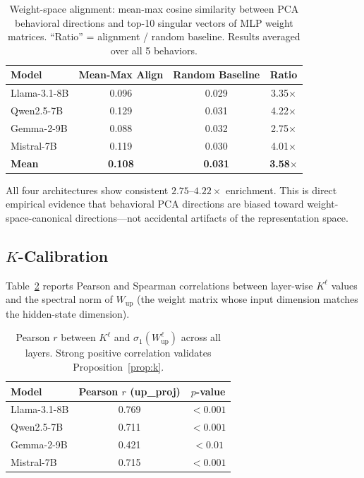 \documentclass{article}
\begin{document}
\begin{table}[t]
\centering
\caption{Weight-space alignment: mean-max cosine similarity between PCA behavioral
  directions and top-10 singular vectors of MLP weight matrices.
  ``Ratio'' = alignment / random baseline.
  Results averaged over all 5 behaviors.}
\label{tab:alignment}
\begin{tabular}{lccc}
\toprule
Model & Mean-Max Align & Random Baseline & Ratio \\
\midrule
Llama-3.1-8B   & 0.096 & 0.029 & 3.35$\times$ \\
Qwen2.5-7B     & 0.129 & 0.031 & 4.22$\times$ \\
Gemma-2-9B     & 0.088 & 0.032 & 2.75$\times$ \\
Mistral-7B     & 0.119 & 0.030 & 4.01$\times$ \\
\midrule
\textbf{Mean}  & \textbf{0.108} & \textbf{0.031} & \textbf{3.58$\times$} \\
\bottomrule
\end{tabular}
\end{table}

All four architectures show consistent $2.75$--$4.22\times$ enrichment.
This is direct empirical evidence that behavioral PCA directions are biased toward
weight-space-canonical directions—not accidental artifacts of the representation space.

\subsection{$K$-Calibration}
\label{sec:exp_k}

Table~\ref{tab:k_spectral} reports Pearson and Spearman correlations between
layer-wise $K^\ell$ values and the spectral norm of $W_\mathrm{up}$ (the
weight matrix whose input dimension matches the hidden-state dimension).

\begin{table}[h]
\centering
\caption{Pearson $r$ between $K^\ell$ and $\sigma_1(W_\mathrm{up}^\ell)$ across all
  layers. Strong positive correlation validates Proposition~\ref{prop:k}.}
\label{tab:k_spectral}
\begin{tabular}{lcc}
\toprule
Model & Pearson $r$ (up\_proj) & $p$-value \\
\midrule
Llama-3.1-8B   & 0.769 & $< 0.001$ \\
Qwen2.5-7B     & 0.711 & $< 0.001$ \\
Gemma-2-9B     & 0.421 & $< 0.01$  \\
Mistral-7B     & 0.715 & $< 0.001$ \\
\bottomrule
\end{tabular}
\end{table}
\end{document}
